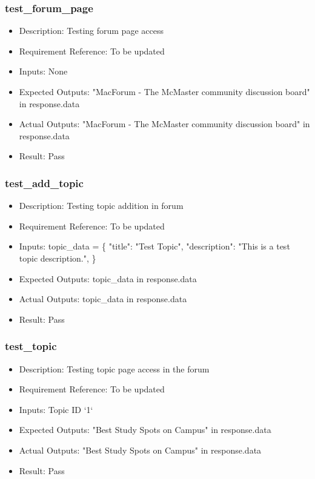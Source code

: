 \documentclass[12pt, titlepage]{article}
\begin{document}
\subsubsection{test\_forum\_page}\label{3.1.11}
\begin{itemize}
    \item Description: Testing forum page access
    \item Requirement Reference: To be updated
    \item Inputs: None
    \item Expected Outputs: "MacForum - The McMaster community discussion board" in response.data
    \item Actual Outputs: "MacForum - The McMaster community discussion board" in response.data
    \item Result: Pass
\end{itemize}
\subsubsection{test\_add\_topic}\label{3.1.12}
\begin{itemize}
    \item Description: Testing topic addition in forum 
    \item Requirement Reference: To be updated
    \item Inputs: topic\_data = \{
        "title": "Test Topic",
        "description": "This is a test topic description.",
    \}
    \item Expected Outputs: topic\_data in response.data
    \item Actual Outputs: topic\_data in response.data
    \item Result: Pass
\end{itemize}
\subsubsection{test\_topic}\label{3.1.13}
\begin{itemize}
    \item Description: Testing topic page access in the forum
    \item Requirement Reference: To be updated
    \item Inputs: Topic ID `1`  
    \item Expected Outputs: "Best Study Spots on Campus" in response.data
    \item Actual Outputs: "Best Study Spots on Campus" in response.data
    \item Result: Pass
\end{itemize}
\end{document}
